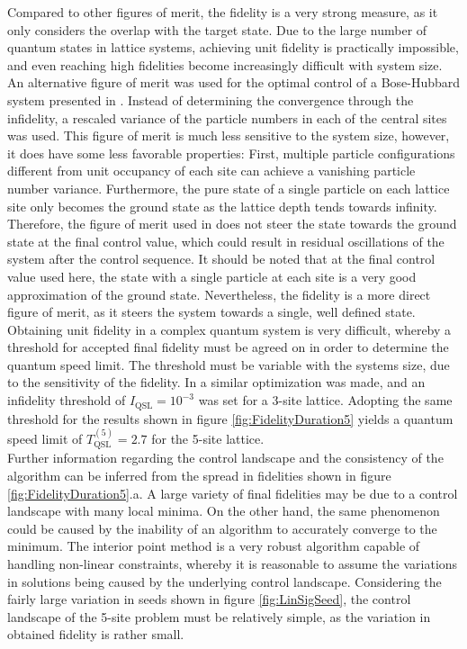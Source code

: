 Compared to other figures of merit, the fidelity is a very strong measure, as it only considers the overlap with the target state. Due to the large number of quantum states in lattice systems, achieving unit fidelity is practically impossible, and even reaching high fidelities become increasingly difficult with system size. An alternative figure of merit was used for the optimal control of a Bose-Hubbard system presented in \cite{FrankBloch}. Instead of determining the convergence through the infidelity, a rescaled variance of the particle numbers in each of the central sites was used. This figure of merit is much less sensitive to the system size, however, it does have some less favorable properties: First, multiple particle configurations different from unit occupancy of each site can achieve a vanishing particle number variance. Furthermore, the pure state of a single particle on each lattice site only becomes the ground state as the lattice depth tends towards infinity. Therefore, the figure of merit used in \cite{FrankBloch} does not steer the state towards the ground state at the final control value, which could result in residual oscillations of the system after the control sequence. It should be noted that at the final control value used here, the state with a single particle at each site is a very good approximation of the ground state.
Nevertheless, the fidelity is a more direct figure of merit, as it steers the system towards a single, well defined state.\\
Obtaining unit fidelity in a complex quantum system is very difficult, whereby a threshold for accepted final fidelity must be agreed on in order to determine the quantum speed limit. The threshold must be variable with the systems size, due to the sensitivity of the fidelity. In \cite{MajaJulie} a similar optimization was made, and an infidelity threshold of $I_{\mathrm{QSL}} = 10^{-3}$ was set for a 3-site lattice. Adopting the same threshold for the results shown in figure \ref{fig:FidelityDuration5} yields a quantum speed limit of $T_{\mathrm{QSL}}^{(5)} = 2.7$ for the 5-site lattice.\\

Further information regarding the control landscape and the consistency of the algorithm can be inferred from the spread in fidelities shown in figure \ref{fig:FidelityDuration5}.a. A large variety of final fidelities may be due to a control landscape with many local minima. On the other hand, the same phenomenon could be caused by the inability of an algorithm to accurately converge to the minimum. The interior point method is a very robust algorithm capable of handling non-linear constraints, whereby it is reasonable to assume the variations in solutions being caused by the underlying control landscape. Considering the fairly large variation in seeds shown in figure \ref{fig:LinSigSeed}, the control landscape of the 5-site problem must be relatively simple, as the variation in obtained fidelity is rather small.


